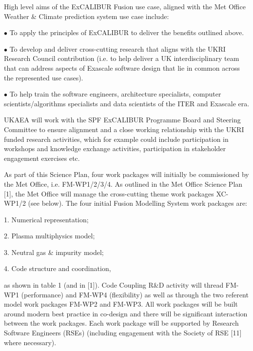 \documentclass{article}
\begin{document}
\vspace{24pt}
High level aims of the ExCALIBUR Fusion use case, aligned with the Met Office Weather 
\& Climate prediction system use case include:

\vspace{24pt}
\leftskip=0pt
$\bullet$ To apply the principles of ExCALIBUR to deliver the benefits outlined above.

\vspace{12pt}
$\bullet$ To develop and deliver cross-cutting research that aligns with the UKRI Research 
Council contribution (i.e. to help deliver a UK interdisciplinary team that can 
address aspects of Exascale software design that lie in common across the represented 
use cases).

\vspace{12pt}
$\bullet$ To help train the software engineers, architecture specialists, computer scientists/algorithms 
specialists and data scientists of the ITER and Exascale era.

\vspace{24pt}
\leftskip=-14pt
UKAEA will work with the SPF ExCALIBUR Programme Board and Steering Committee to 
ensure alignment and a close working relationship with the UKRI funded research 
activities, which for example could include participation in workshops and knowledge 
exchange activities, participation in stakeholder engagement exercises etc.

\vspace{24pt}
As part of this Science Plan, four work packages will initially be commissioned 
by the Met Office, i.e. FM-WP1/2/3/4. As outlined in the Met Office Science Plan 
[1], the Met Office will manage the cross-cutting theme work packages XC-WP1/2 
(see below). The four initial Fusion Modelling System work packages are:

\vspace{24pt}
\leftskip=0pt
1. Numerical representation;

\vspace{12pt}
2. Plasma multiphysics model;

\vspace{12pt}
3. Neutral gas \& impurity model;

\vspace{12pt}
4. Code structure and coordination,

\vspace{24pt}
\leftskip=-14pt
as shown in table 1 (and in [1]). Code Coupling R\&D activity will thread FM-WP1 
(performance) and FM-WP4 (flexibility) as well as through the two referent model 
work packages FM-WP2 and FM-WP3. All work packages will be built around modern 
best practice in co-design and there will be significant interaction between the 
work packages. Each work package will {\color{color29} be supported by Research 
Software Engineers (RSEs) (including engagement with the Society of RSE [11]} where 
necessary).
\end{document}
